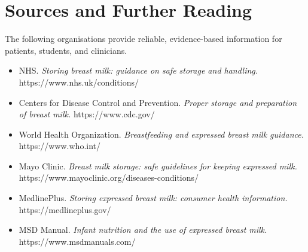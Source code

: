 \section*{Sources and Further Reading}
The following organisations provide reliable, evidence-based information for patients, students, and clinicians.

\begin{itemize}
    \item NHS. \textit{Storing breast milk: guidance on safe storage and handling.} https://www.nhs.uk/conditions/
    \item Centers for Disease Control and Prevention. \textit{Proper storage and preparation of breast milk.} https://www.cdc.gov/
    \item World Health Organization. \textit{Breastfeeding and expressed breast milk guidance.} https://www.who.int/
    \item Mayo Clinic. \textit{Breast milk storage: safe guidelines for keeping expressed milk.} https://www.mayoclinic.org/diseases-conditions/
    \item MedlinePlus. \textit{Storing expressed breast milk: consumer health information.} https://medlineplus.gov/
    \item MSD Manual. \textit{Infant nutrition and the use of expressed breast milk.} https://www.msdmanuals.com/
\end{itemize}
